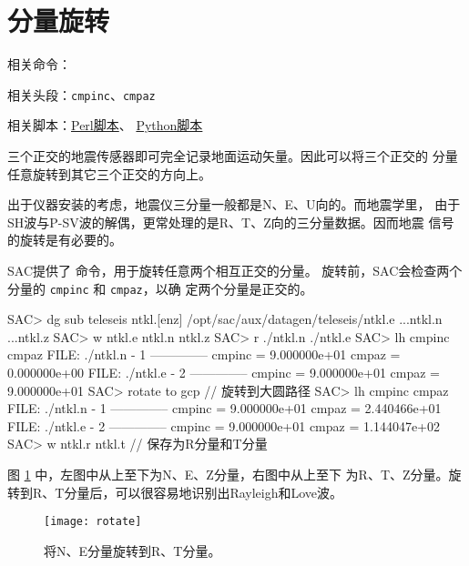 \section{分量旋转}
\label{sec:traces-rotating}
相关命令：

相关头段：\texttt{cmpinc}、\texttt{cmpaz}

相关脚本：\hyperref[subsec:rotate-perl]{Perl脚本}、
          \hyperref[subsec:rotate-python]{Python脚本}

三个正交的地震传感器即可完全记录地面运动矢量。因此可以将三个正交的
分量任意旋转到其它三个正交的方向上。

出于仪器安装的考虑，地震仪三分量一般都是N、E、U向的。而地震学里，
由于SH波与P-SV波的解偶，更常处理的是R、T、Z向的三分量数据。因而地震
信号的旋转是有必要的。

SAC提供了  命令，用于旋转任意两个相互正交的分量。
旋转前，SAC会检查两个分量的 \texttt{cmpinc} 和 \texttt{cmpaz}，以确
定两个分量是正交的。

\begin{SACCode}
SAC> dg sub teleseis ntkl.[enz]
/opt/sac/aux/datagen/teleseis/ntkl.e ...ntkl.n ...ntkl.z
SAC> w ntkl.e ntkl.n ntkl.z
SAC> r ./ntkl.n ./ntkl.e
SAC> lh cmpinc cmpaz
  FILE: ./ntkl.n - 1
 --------------
     cmpinc = 9.000000e+01
      cmpaz = 0.000000e+00
  FILE: ./ntkl.e - 2
 --------------
     cmpinc = 9.000000e+01
      cmpaz = 9.000000e+01
SAC> rotate to gcp              // 旋转到大圆路径
SAC> lh cmpinc cmpaz
  FILE: ./ntkl.n - 1
 --------------
     cmpinc = 9.000000e+01
      cmpaz = 2.440466e+01
  FILE: ./ntkl.e - 2
 --------------
     cmpinc = 9.000000e+01
      cmpaz = 1.144047e+02
SAC> w ntkl.r ntkl.t            // 保存为R分量和T分量
\end{SACCode}

图 \ref{fig:rotate} 中，左图中从上至下为N、E、Z分量，右图中从上至下
为R、T、Z分量。旋转到R、T分量后，可以很容易地识别出Rayleigh和Love波。

\begin{figure}[H]
\centering
\texttt{[image: rotate]}
\caption[水平分量旋转]{将N、E分量旋转到R、T分量。}
\label{fig:rotate}
\end{figure}
